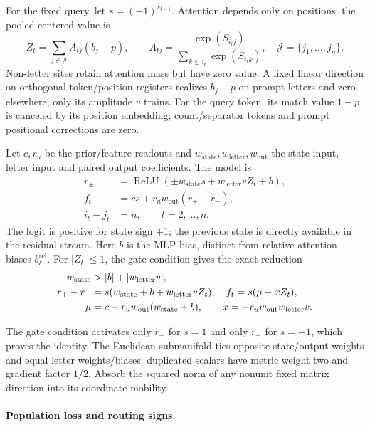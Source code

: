 For the fixed query, let $s=(-1)^{s_{t-1}}$. Attention depends only on positions; the pooled centered value is
\begin{equation}\label{eq:lr-centered-value}
 Z_t=\sum_{j\in\mathcal J}A_{tj}(b_j-p),\qquad
 A_{tj}=\frac{\exp(S_{i_tj})}{\sum_{k\le i_t}\exp(S_{i_tk})},
 \quad \mathcal J=\{j_1,\ldots,j_n\}.
\end{equation}
Non-letter sites retain attention mass but have zero value.
A fixed linear direction on orthogonal token/position registers realizes
$b_j-p$ on prompt letters and zero elsewhere; only its amplitude $v$ trains.
For the query token, its match value $1-p$ is canceled by its position
embedding; count/separator tokens and prompt positional corrections are zero.

Let $c,r_u$ be the prior/feature readouts and
$w_{\mathrm{state}},w_{\mathrm{letter}},w_{\mathrm{out}}$ the state input,
letter input and paired output coefficients. The model is
\begin{align}
 r_\pm&=\operatorname{ReLU}(\pm w_{\mathrm{state}}s+w_{\mathrm{letter}}vZ_t+b),
 \label{eq:lr-gates}\\
 f_t&=cs+r_uw_{\mathrm{out}}(r_+-r_-),\label{eq:lr-factor-logit}\\
 i_t-j_t&=n,\qquad t=2,\ldots,n.\label{eq:lr-constant-lag}
\end{align}
The logit is positive for state sign $+1$; the previous state is directly
available in the residual stream. Here $b$ is the MLP bias, distinct from
relative attention biases $b_\ell^{\mathrm{rel}}$.
For $|Z_t|\le1$, the gate condition gives the exact reduction
\begin{align}
 w_{\mathrm{state}}&>|b|+|w_{\mathrm{letter}}v|,\label{eq:lr-gate-condition}\\
 r_+-r_-&=s(w_{\mathrm{state}}+b+w_{\mathrm{letter}}vZ_t),\quad
 f_t=s(\mu-xZ_t),\label{eq:lr-feature-param}\\
 \mu&=c+r_uw_{\mathrm{out}}(w_{\mathrm{state}}+b),\qquad
 x=-r_uw_{\mathrm{out}}w_{\mathrm{letter}}v.\notag
\end{align}

The gate condition activates only $r_+$ for $s=1$ and only $r_-$ for $s=-1$,
which proves the identity. The Euclidean submanifold ties opposite
state/output weights and equal letter weights/biases: duplicated scalars
have metric weight two and gradient factor $1/2$. Absorb the squared norm
of any nonunit fixed matrix direction into its coordinate mobility.

\paragraph{Population loss and routing signs.}
\label{app:weak-routing-signs}

